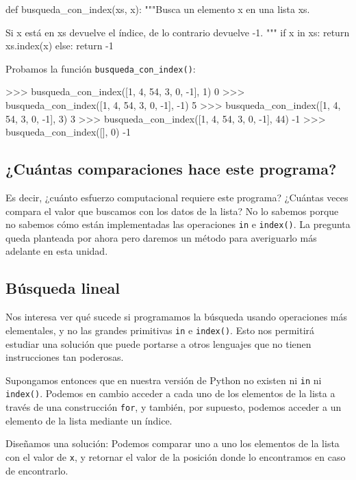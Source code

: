 \begin{codigo-python-sn}
def busqueda_con_index(xs, x):
    """Busca un elemento x en una lista xs.

    Si x está en xs devuelve el índice,
    de lo contrario devuelve -1.
    """
    if x in xs:
        return xs.index(x)
    else:
        return -1
\end{codigo-python-sn}

Probamos la función \verb+busqueda_con_index()+:

\begin{codigo-python-sn}
>>> busqueda_con_index([1, 4, 54, 3, 0, -1], 1)
0
>>> busqueda_con_index([1, 4, 54, 3, 0, -1], -1)
5
>>> busqueda_con_index([1, 4, 54, 3, 0, -1], 3)
3
>>> busqueda_con_index([1, 4, 54, 3, 0, -1], 44)
-1
>>> busqueda_con_index([], 0)
-1
\end{codigo-python-sn}

\subsection*{¿Cuántas comparaciones hace este programa?}

Es decir, ¿cuánto esfuerzo computacional requiere
este programa? ¿Cuántas veces compara el valor que buscamos con los datos de
la lista? No lo sabemos porque no sabemos cómo están implementadas las
operaciones \lstinline+in+ e \lstinline+index()+. La pregunta queda planteada
por ahora pero daremos un método para averiguarlo más adelante en esta unidad.


\subsection*{Búsqueda lineal}

Nos interesa ver qué sucede si programamos la búsqueda usando operaciones más
elementales, y no las grandes primitivas \lstinline+in+ e \lstinline+index()+.
Esto nos permitirá estudiar una solución que puede portarse a otros lenguajes
que no tienen instrucciones tan poderosas.

Supongamos entonces que en nuestra versión de Python no existen ni \lstinline+in+
ni \lstinline+index()+. Podemos en cambio acceder a cada uno de los elementos
de la lista a través de una construcción \lstinline+for+, y también, por
supuesto, podemos acceder a un elemento de la lista mediante un índice.

Diseñamos una solución: Podemos comparar uno a uno los elementos de la
lista con el valor de \lstinline!x!, y retornar el valor de la posición
donde lo encontramos en caso de encontrarlo.

